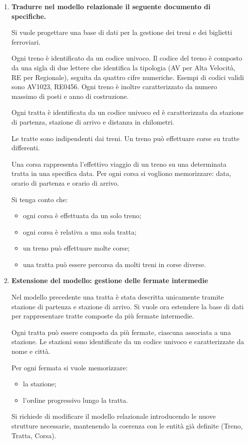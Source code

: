 \documentclass[a4paper,12pt]{article}
\begin{document}
\begin{enumerate}
\item \textbf{Tradurre nel modello relazionale il seguente documento di specifiche.}

Si vuole progettare una base di dati per la gestione dei treni e dei biglietti ferroviari.

Ogni treno è identificato da un codice univoco.
Il codice del treno è composto da una sigla di due lettere che identifica la tipologia (AV per Alta Velocità, RE per Regionale), seguita da quattro cifre numeriche. 
Esempi di codici validi sono AV1023, RE0456.
Ogni treno è inoltre caratterizzato da numero massimo di posti e anno di costruzione.

Ogni tratta è identificata da un codice univoco ed è caratterizzata da stazione di partenza, stazione di arrivo e distanza in chilometri.

Le tratte sono indipendenti dai treni.
Un treno può effettuare corse su tratte differenti.

Una corsa rappresenta l’effettivo viaggio di un treno su una determinata tratta in una specifica data.
Per ogni corsa si vogliono memorizzare:
data, orario di partenza e orario di arrivo.

Si tenga conto che:
\begin{itemize}
    \item ogni corsa è effettuata da un solo treno;
    \item ogni corsa è relativa a una sola tratta;
    \item un treno può effettuare molte corse;
    \item una tratta può essere percorsa da molti treni in corse diverse.
\end{itemize}

\item \textbf{Estensione del modello: gestione delle fermate intermedie}

Nel modello precedente una tratta è stata descritta unicamente tramite stazione di partenza e stazione di arrivo. Si vuole ora estendere la base di dati per rappresentare tratte composte da più fermate intermedie.

Ogni tratta può essere composta da più fermate, ciascuna associata a una stazione.
Le stazioni sono identificate da un codice univoco e caratterizzate da nome e città.

Per ogni fermata si vuole memorizzare:
\begin{itemize}
    \item la stazione;
    \item l'ordine progressivo lungo la tratta.
\end{itemize}

Si richiede di modificare il modello relazionale introducendo le nuove strutture necessarie,
mantenendo la coerenza con le entità già definite (Treno, Tratta, Corsa).

\end{enumerate}
\end{document}
